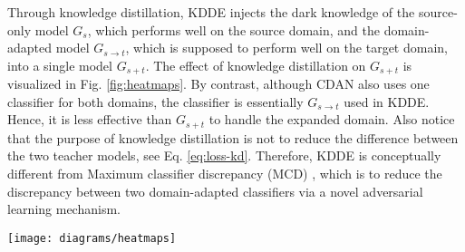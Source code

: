 Through knowledge distillation, KDDE injects the dark knowledge of the source-only model $G_s$, which performs well on the source domain, and the domain-adapted model $G_{s\rightarrow t}$, which is supposed to perform well on the target domain, into a single model $G_{s+t}$. The effect of knowledge distillation on $G_{s+t}$ is visualized in Fig. \ref{fig:heatmaps}. By contrast, although CDAN also uses one classifier for both domains, the classifier is essentially $G_{s\rightarrow t}$ used in KDDE. Hence, it is less effective than $G_{s+t}$ to handle the expanded domain. Also notice that the purpose of knowledge distillation is not to reduce the difference between the two teacher models, see Eq. \ref{eq:loss-kd}. Therefore, KDDE is conceptually different from Maximum classifier discrepancy (MCD) \cite{cvpr2018-mcd}, which is to reduce the discrepancy between two domain-adapted classifiers via a novel adversarial learning mechanism.


\begin{figure*}[tbh!]
\setlength{\abovecaptionskip}{5pt}
\centering
\texttt{[image: diagrams/heatmaps]}
\caption{\textbf{Grad-CAM heatmaps of ResNet-50, CDAN and KDDE}. Heatmaps highlight regions important for a model to make predictions. Test images in the first three rows are from the source domain (\textit{clipart}), while images in the last three rows are from the target domain (\textit{real}). Activated regions of KDDE ($G_{s+t}$) match well with those of ResNet-50 ($G_s$) on the source domain and those of CDAN ($G_{s\rightarrow t}$) on the target domain, suggesting the ability of KDDE to adaptively learn from the two domain-specific models. Data from DomainNet.}
\label{fig:heatmaps}
\end{figure*} 














%
